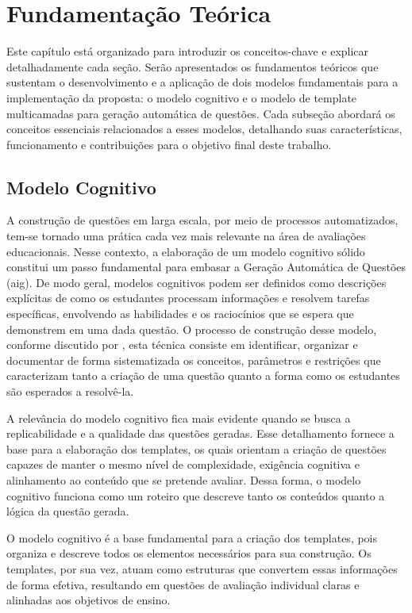 \chapter{Fundamentação Teórica}\label{cap:fundamentacao-teorica}

Este capítulo está organizado para introduzir os conceitos-chave e explicar detalhadamente cada seção. Serão apresentados os fundamentos teóricos que sustentam o desenvolvimento e a aplicação de dois modelos fundamentais para a implementação da proposta: o modelo cognitivo e o modelo de template multicamadas para geração automática de questões. Cada subseção abordará os conceitos essenciais relacionados a esses modelos, detalhando suas características, funcionamento e contribuições para o objetivo final deste trabalho.

\section{Modelo Cognitivo}
A construção de questões em larga escala, por meio de processos automatizados, tem-se tornado uma prática cada vez mais relevante na área de avaliações educacionais. Nesse contexto, a elaboração de um modelo cognitivo sólido constitui um passo fundamental para embasar a Geração Automática de Questões (\gls{aig}). De modo geral, modelos cognitivos podem ser definidos como descrições explícitas de como os estudantes processam informações e resolvem tarefas específicas, envolvendo as habilidades e os raciocínios que se espera que demonstrem em uma dada questão. O processo de construção desse modelo, conforme discutido por \parencite{gierl2021}, esta técnica consiste em identificar, organizar e documentar de forma sistematizada os conceitos, parâmetros e restrições que caracterizam tanto a criação de uma questão quanto a forma como os estudantes são esperados a resolvê-la.

A relevância do modelo cognitivo fica  mais evidente quando se busca a replicabilidade e a qualidade das questões geradas. Esse detalhamento fornece a base para a elaboração dos templates, os quais orientam a criação de questões capazes de manter o mesmo nível de complexidade, exigência cognitiva e alinhamento ao conteúdo que se pretende avaliar. Dessa forma, o modelo cognitivo funciona como um roteiro que descreve tanto os conteúdos quanto a lógica da questão gerada.

O modelo cognitivo é a base fundamental para a criação dos templates, pois organiza e descreve todos os elementos necessários para sua construção. Os templates, por sua vez, atuam como estruturas que convertem essas informações de forma efetiva, resultando em questões de avaliação individual claras e alinhadas aos objetivos de ensino.


